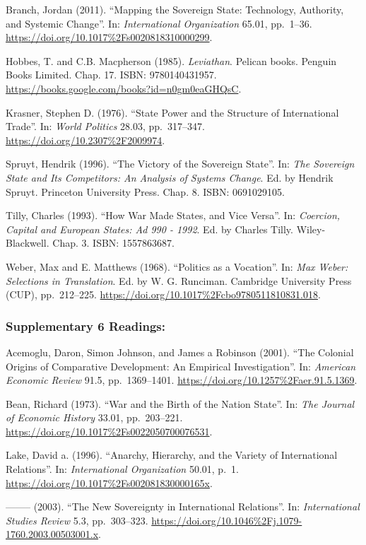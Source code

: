 \documentclass[10pt,]{article}
\begin{document}
Branch, Jordan (2011). ``Mapping the Sovereign State: Technology,
Authority, and Systemic Change''. In: \emph{International Organization}
65.01, pp.~1--36. \url{https://doi.org/10.1017\%2Fs0020818310000299}.

Hobbes, T. and C.B. Macpherson (1985). \emph{Leviathan}. Pelican books.
Penguin Books Limited. Chap. 17. ISBN: 9780140431957.
\url{https://books.google.com/books?id=n0gm0eaGHQsC}.

Krasner, Stephen D. (1976). ``State Power and the Structure of
International Trade''. In: \emph{World Politics} 28.03, pp.~317--347.
\url{https://doi.org/10.2307\%2F2009974}.

Spruyt, Hendrik (1996). ``The Victory of the Sovereign State''. In:
\emph{The Sovereign State and Its Competitors: An Analysis of Systems Change}.
Ed. by Hendrik Spruyt. Princeton University Press. Chap. 8. ISBN:
0691029105.

Tilly, Charles (1993). ``How War Made States, and Vice Versa''. In:
\emph{Coercion, Capital and European States: Ad 990 - 1992}. Ed. by
Charles Tilly. Wiley-Blackwell. Chap. 3. ISBN: 1557863687.

Weber, Max and E. Matthews (1968). ``Politics as a Vocation''. In:
\emph{Max Weber: Selections in Translation}. Ed. by W. G. Runciman.
Cambridge University Press (CUP), pp.~212--225.
\url{https://doi.org/10.1017\%2Fcbo9780511810831.018}.

\subsubsection{Supplementary \textbar{} 6
Readings:}\label{supplementary-6-readings}

Acemoglu, Daron, Simon Johnson, and James a Robinson (2001). ``The
Colonial Origins of Comparative Development: An Empirical
Investigation''. In: \emph{American Economic Review} 91.5,
pp.~1369--1401. \url{https://doi.org/10.1257\%2Faer.91.5.1369}.

Bean, Richard (1973). ``War and the Birth of the Nation State''. In:
\emph{The Journal of Economic History} 33.01, pp.~203--221.
\url{https://doi.org/10.1017\%2Fs0022050700076531}.

Lake, David a. (1996). ``Anarchy, Hierarchy, and the Variety of
International Relations''. In: \emph{International Organization} 50.01,
p.~1. \url{https://doi.org/10.1017\%2Fs002081830000165x}.

-------- (2003). ``The New Sovereignty in International Relations''. In:
\emph{International Studies Review} 5.3, pp.~303--323.
\url{https://doi.org/10.1046\%2Fj.1079-1760.2003.00503001.x}.
\end{document}
